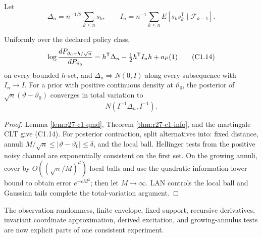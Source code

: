 Let
\[
 \Delta_n=n^{-1/2}\sum_{k\le n}s_k,\qquad
 I_n=n^{-1}\sum_{k\le n}E[s_ks_k^\mathsf T\mid\mathcal F_{k-1}].
\]

\begin{theorem}
\label{thm:r27-c1-bvm}
Uniformly over the declared policy class,
\[
 \log{dP_{\vartheta_0+h/\sqrt n}\over dP_{\vartheta_0}}
 =h^\mathsf T\Delta_n-\tfrac12h^\mathsf TI_nh+o_P(1)       \tag{C1.14}
\]
on every bounded $h$-set, and $\Delta_n\Rightarrow N(0,I)$ along every
subsequence with $I_n\to I$.  For a prior with positive continuous density at
$\vartheta_0$, the posterior of $\sqrt n(\vartheta-\vartheta_0)$ converges in
total variation to
\[
 N(I^{-1}\Delta_n,I^{-1}).                                \tag{C1.15}
\]
\end{theorem}

\begin{proof}
Lemma \ref{lem:r27-c1-qmd}, Theorem \ref{thm:r27-c1-info}, and the martingale
CLT give (C1.14).  For posterior contraction, split alternatives into:
fixed distance, annuli $M/\sqrt n\le|\vartheta-\vartheta_0|\le\delta$, and
the local ball.  Hellinger tests from the positive noisy channel are
exponentially consistent on the first set.  On the growing annuli, cover by
$O((\sqrt n/M)^d)$ local balls and use the quadratic information lower bound
to obtain error $e^{-cM^2}$; then let $M\to\infty$.  LAN controls the local
ball and Gaussian tails complete the total-variation argument.
\end{proof}

The observation randomness, finite envelope, fixed support, recursive
derivatives, invariant coordinate approximation, derived excitation, and
growing-annulus tests are now explicit parts of one consistent experiment.
